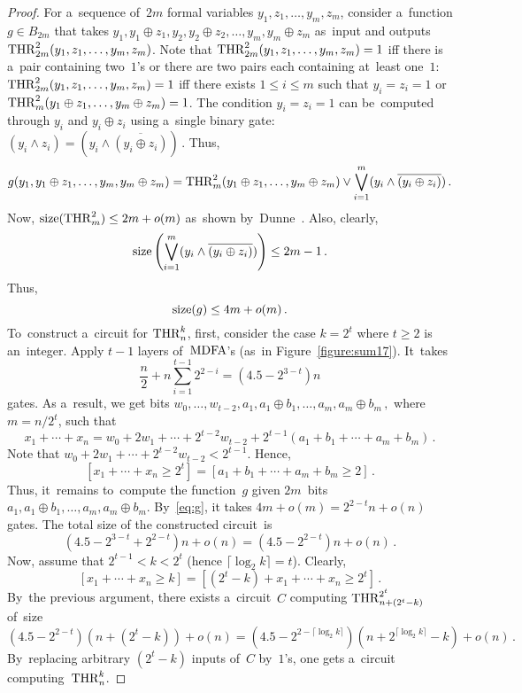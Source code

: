 \begin{proof}
    For a~sequence of~$2m$ formal variables $y_1, z_1, \dotsc, y_m, z_m$,
    consider a~function $g \in B_{2m}$ that takes
    \(y_1, y_1 \oplus z_1, y_2, y_2 \oplus z_2, \dotsc, y_m, y_m \oplus z_m\)
    as~input and outputs $\operatorname{THR}_{2m}^2(y_1, z_1, \dotsc, y_m, z_m)$.
    Note that $\operatorname{THR}_{2m}^2(y_1, z_1, \dotsc, y_m, z_m)=1$ iff there is
    a~pair containing two~$1$'s or there are two pairs each containing at~least one~$1$: $\operatorname{THR}_{2m}^2(y_1, z_1, \dotsc, y_m, z_m)=1$ iff there exists
    $1 \le i \le m$ such that $y_i=z_i=1$ or $\operatorname{THR}_m^2(y_1 \oplus z_1, \dotsc, y_m \oplus z_m)=1$. The condition $y_i=z_i=1$ can be~computed
    through $y_i$ and $y_i \oplus z_i$ using a~single binary gate:
    \((y_i \land z_i)=(y_i \land \overline{(y_i \oplus z_i)}) \, .\)
    Thus,
    \[g(y_1, y_1 \oplus z_1,\dotsc, y_m, y_m \oplus z_m)=\operatorname{THR}_m^2(y_1 \oplus z_1, \dotsc, y_m \oplus z_m) \lor \bigvee_{i=1}^{m}(y_i \land \overline{(y_i \oplus z_i)}) \, .\]
    Now, $\operatorname{size}(\operatorname{THR}_m^2) \le 2m+o(m)$ as~shown by~Dunne~\cite{Dunne84}.
    Also, clearly,
    \[\operatorname{size}\left(\bigvee_{i=1}^{m}(y_i \land \overline{(y_i \oplus z_i)}) \right)\le 2m-1 \, .\]
    Thus,
    \begin{equation}\label{eq:g}
        \operatorname{size}(g) \le 4m+o(m) \, .
    \end{equation}
%
    To~construct a~circuit for $\operatorname{THR}_n^k$, first, consider the case $k=2^t$ where $t \ge 2$ is an~integer.
    Apply $t-1$
    layers of~$\operatorname{MDFA}$'s (as~in Figure~\ref{figure:sum17}). It~takes
    \[\frac{n}{2} + n\sum\limits_{i=1}^{t-1} 2^{2-i}=(4.5 - 2^{3-t})n\] gates.
    As a~result, we get bits \(w_0, \dotsc, w_{t-2}, a_1, a_1 \oplus b_1, \dotsc, a_m, a_m \oplus b_m \,, \)
    where $m=n/2^t$,
    such that
    \[x_1+\dotsb+x_n=w_0+2w_1+\dotsb+2^{t-2}w_{t-2}+2^{t-1}(a_1+b_1+\dotsb+a_m+b_m) \, .\]
    Note that $w_0+2w_1+\dotsb+2^{t-2}w_{t-2} < 2^{t-1}$. Hence,
    \[[x_1+\dotsb+x_n \ge 2^t]=[a_1+b_1+\dotsb+a_m+b_m \ge 2]\,.\]
    Thus, it~remains to~compute the function~$g$
    given $2m$~bits $a_1, a_1 \oplus b_1, \dotsc, a_m, a_m \oplus b_m$.
    By~\eqref{eq:g}, it takes $4m+o(m)=2^{2-t}n+o(n)$ gates.
    The total size of the constructed circuit~is
    \[(4.5-2^{3-t}+2^{2-t})n+o(n)=(4.5-2^{2-t})n+o(n) \, .\]
    Now, assume that $2^{t-1}<k<2^t$ (hence $\lceil \log_2k \rceil = t$).
    Clearly,
    \[[x_1+\dotsb+x_n \ge k]=[(2^t-k)+x_1+\dotsb+x_n \ge 2^t] \, .\]
    By~the previous argument, there exists a~circuit~$C$ computing $\operatorname{THR}_{n+(2^t-k)}^{2^t}$ of~size
    \[(4.5-2^{2-t})(n+(2^t-k))+o(n)=(4.5-2^{2-{{\lceil \log_2k \rceil}}})(n+2^{\lceil \log_2k \rceil}-k)+o(n) \, .\]
    By~replacing arbitrary $(2^t-k)$ inputs of~$C$ by~$1$'s,
    one gets a~circuit computing~$\operatorname{THR}_n^k$.
\end{proof}

